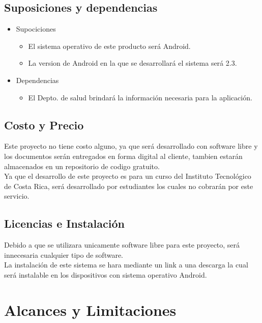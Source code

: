 \documentclass[12pt]{article}
\begin{document}
\subsection{Suposiciones y dependencias}

\begin{itemize}

\item{Supociciones}
\begin{itemize}
	\item{El sistema operativo de este producto ser\'a Android.}
	\item{La version de Android en la que se desarrollar\'a el sistema ser\'a 2.3.}
\end{itemize}

\item{Dependencias}
\begin{itemize}
	\item{El Depto. de salud brindar\'a la informaci\'on necesaria para la aplicaci\'on.}
\end{itemize}

\end{itemize}

\subsection{Costo y Precio}

Este proyecto no tiene costo alguno, ya que ser\'a desarrollado con software libre y los documentos ser\'an entregados en forma digital al cliente, tambien estar\'an almacenados en un repositorio de codigo gratuito. \\[0.2in]
Ya que el desarrollo de este proyecto es para un curso del Instituto Tecnol\'ogico de Costa Rica, ser\'a desarrollado por estudiantes los cuales no cobrar\'an por este servicio.

\subsection{Licencias e Instalaci\'on}

Debido a que se utilizara unicamente software libre para este proyecto, ser\'a innecesaria cualquier tipo de software.\\
La instalaci\'on de este sistema se hara mediante un link a una descarga la cual ser\'a instalable en los dispositivos con sistema operativo Android.

\newpage
\section{Alcances y Limitaciones}
\end{document}
